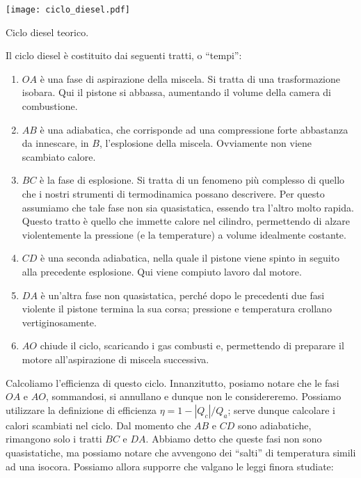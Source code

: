 \begin{marginfigure}
    \centering
    \texttt{[image: ciclo\_diesel.pdf]}
    \caption{Ciclo diesel teorico.}
    \label{erciclodiesel}
\end{marginfigure}

\noindent Il ciclo diesel è costituito dai seguenti tratti, o
``tempi'':
\begin{enumerate}
    \item $OA$ è una fase di aspirazione della miscela. Si
    tratta di una trasformazione isobara. Qui il pistone si
    abbassa, aumentando il volume della camera di combustione.

    \item $AB$ è una adiabatica, che corrisponde ad una compressione
    forte abbastanza da innescare, in $B$, l'esplosione della
    miscela. Ovviamente non viene scambiato calore.

    \item $BC$ è la fase di esplosione. Si tratta di un fenomeno
    più complesso di quello che i nostri strumenti di termodinamica
    possano descrivere. Per questo assumiamo che tale fase non
    sia quasistatica, essendo tra l'altro molto rapida. Questo tratto
    è quello che immette calore
    nel cilindro, permettendo di alzare violentemente la pressione
    (e la temperature) a volume idealmente costante.

    \item $CD$ è una seconda adiabatica, nella quale il pistone
    viene spinto in seguito alla precedente esplosione. Qui viene
    compiuto lavoro dal motore.

    \item $DA$ è un'altra fase non quasistatica, perché dopo le
    precedenti due fasi violente il pistone termina la sua
    corsa; pressione e temperatura crollano vertiginosamente.

    \item $AO$ chiude il ciclo, scaricando i gas combusti e,
    permettendo di preparare il motore all'aspirazione di miscela
    successiva.
\end{enumerate}

Calcoliamo l'efficienza di questo ciclo. Innanzitutto, posiamo
notare che le fasi $OA$ e $AO$, sommandosi, si annullano e dunque
non le considereremo. Possiamo utilizzare la definizione di
efficienza $\eta = 1 - |Q_c|/Q_a$; serve dunque calcolare i
calori scambiati nel ciclo. Dal momento che $AB$ e $CD$ sono
adiabatiche, rimangono solo i tratti $BC$ e $DA$. Abbiamo detto
che queste fasi non sono quasistatiche, ma possiamo notare che
avvengono dei ``salti'' di temperatura simili ad una isocora.
Possiamo allora supporre che valgano le leggi finora studiate:

